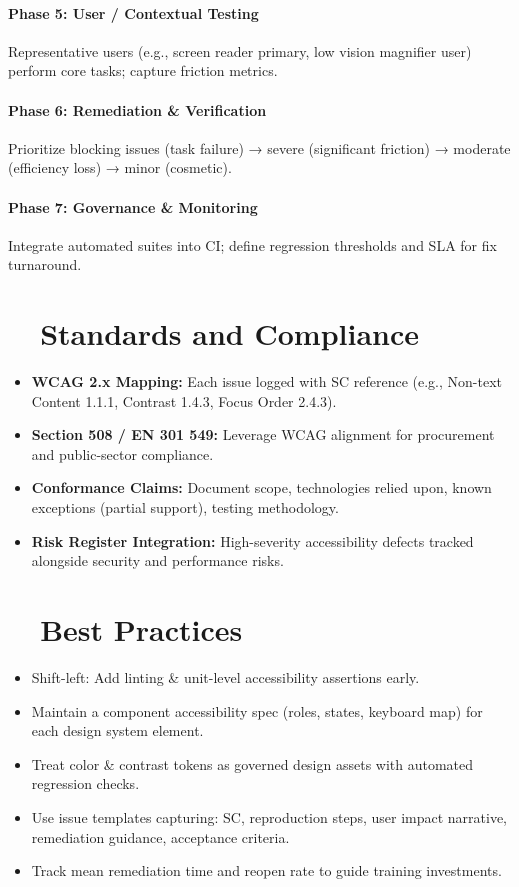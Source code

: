 \paragraph{Phase 5: User / Contextual Testing} Representative users (e.g., screen reader primary, low vision magnifier user) perform core tasks; capture friction metrics.
\paragraph{Phase 6: Remediation & Verification} Prioritize blocking issues (task failure) → severe (significant friction) → moderate (efficiency loss) → minor (cosmetic).
\paragraph{Phase 7: Governance & Monitoring} Integrate automated suites into CI; define regression thresholds and SLA for fix turnaround.

\section{~~Standards and Compliance}\label{sec:standards-compliance-auditing}
\begin{itemize}
	\item \textbf{WCAG 2.x Mapping:} Each issue logged with SC reference (e.g., Non-text Content 1.1.1, Contrast 1.4.3, Focus Order 2.4.3).
	\item \textbf{Section 508 / EN 301 549:} Leverage WCAG alignment for procurement and public-sector compliance.
	\item \textbf{Conformance Claims:} Document scope, technologies relied upon, known exceptions (partial support), testing methodology.
	\item \textbf{Risk Register Integration:} High-severity accessibility defects tracked alongside security and performance risks.
\end{itemize}

\section{~~Best Practices}\label{sec:best-practices-auditing}
\begin{itemize}
	\item Shift-left: Add linting & unit-level accessibility assertions early.
	\item Maintain a component accessibility spec (roles, states, keyboard map) for each design system element.
	\item Treat color & contrast tokens as governed design assets with automated regression checks.
	\item Use issue templates capturing: SC, reproduction steps, user impact narrative, remediation guidance, acceptance criteria.
	\item Track mean remediation time and reopen rate to guide training investments.
\end{itemize}

